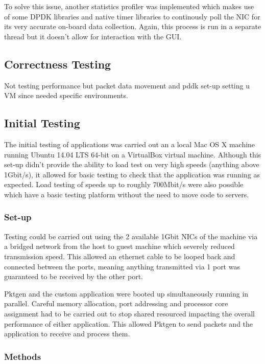 \documentclass[final_report.tex]{subfiles}
\begin{document}
To solve this issue, another statistics profiler was implemented which makes use of some DPDK libraries and native timer libraries to continously poll the NIC for its very accurate on-board data collection. Again, this process is run in a separate thread but it doesn't allow for interaction with the GUI.

\subsection{Correctness Testing}
Not testing performance but packet data movement and pddk set-up
setting u VM since needed specific environments.

\subsection{Initial Testing}
The initial testing of applications  was carried out an a local Mac OS X machine running Ubuntu 14.04 LTS 64-bit on a VirtualBox  virtual machine. Although this set-up didn't provide the ability to load test on very high speeds (anything above 1Gbit/s), it allowed for basic testing to check that the application was running as expected. Load testing of speeds up to roughly 700Mbit/s were also possible which have a basic testing platform without the need to move code to servers.


\subsubsection{Set-up}
Testing could be carried out using the 2 available 1Gbit NICs of the machine via a bridged network from the host to guest machine which severely reduced transmission speed. This allowed an ethernet cable to be looped back and connected between the ports, meaning anything transmitted via 1 port was guaranteed to be received by the other port.

Pktgen and the custom application were booted up simultaneously running in parallel. Careful memory allocation, port addressing and processor core assignment had to be carried out to stop shared resourced impacting the overall performance of either application. This allowed Pktgen to send packets and the application to receive and process them.

\subsubsection{Methods}
\end{document}
